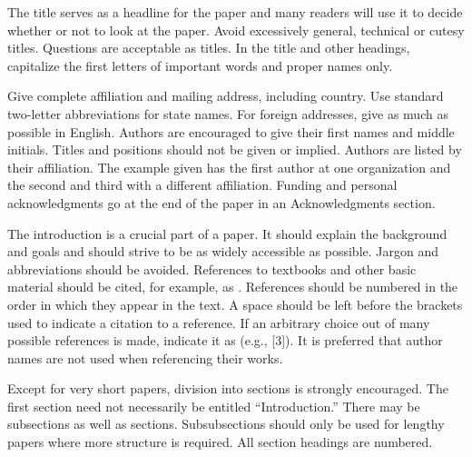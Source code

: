 \documentclass{article}
\begin{document}
The title serves as a headline for the paper and many readers will use it to decide whether or not to look at the paper. Avoid excessively general,
technical or cutesy titles. Questions are acceptable as titles. In the title and other headings, capitalize the first letters of important words
and proper names only. 

Give complete affiliation and mailing address, including country. Use standard two-letter abbreviations for state names. For foreign addresses, give
as much as possible in English. Authors are encouraged to give their first names and middle initials. Titles and positions should not be given or
implied. Authors are listed by their affiliation. The example given has the first author at one organization and the second and third with a different
affiliation. Funding and personal acknowledgments go at the end of the paper in an Acknowledgments section. 

\break

The introduction is a crucial part of a paper. It should explain the background and goals and should strive to be as widely accessible
as possible. Jargon and abbreviations should be avoided. References to textbooks and other basic material should be cited, for example, as \cite{a-review,text-a,text-b}. 
References should be numbered in the order in which they appear in the text. A space should be left before the brackets used to indicate a citation
to a reference. If an arbitrary choice out of many possible references is made, indicate it as (e.g., [3]). It is preferred that author names are
not used when referencing their works. 

Except for very short papers, division into sections is strongly encouraged. The first section need not necessarily be entitled {``}Introduction.{''}
%
There may be subsections as well as sections. Subsubsections should only be used for lengthy papers where more structure is required. All section
headings are numbered. 
\end{document}
